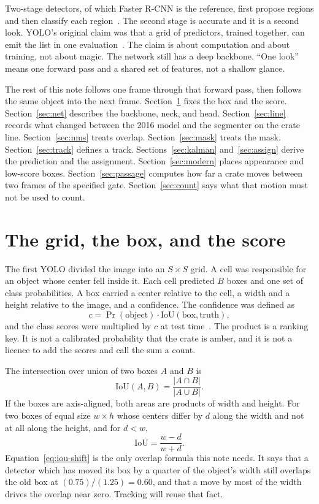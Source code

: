 \documentclass[11pt,a4paper]{article}
\begin{document}
Two-stage detectors, of which Faster R-CNN is the reference, first propose regions and then classify each region~\cite{ren2015faster}. The second stage is accurate and it is a second look. YOLO's original claim was that a grid of predictors, trained together, can emit the list in one evaluation~\cite{redmon2016yolo}. The claim is about computation and about training, not about magic. The network still has a deep backbone. ``One look'' means one forward pass and a shared set of features, not a shallow glance.

The rest of this note follows one frame through that forward pass, then follows the same object into the next frame. Section~\ref{sec:grid} fixes the box and the score. Section~\ref{sec:net} describes the backbone, neck, and head. Section~\ref{sec:line} records what changed between the 2016 model and the segmenter on the crate line. Section~\ref{sec:nms} treats overlap. Section~\ref{sec:mask} treats the mask. Section~\ref{sec:track} defines a track. Sections~\ref{sec:kalman} and~\ref{sec:assign} derive the prediction and the assignment. Section~\ref{sec:modern} places appearance and low-score boxes. Section~\ref{sec:passage} computes how far a crate moves between two frames of the specified gate. Section~\ref{sec:count} says what that motion must not be used to count.

\section{The grid, the box, and the score}
\label{sec:grid}

The first YOLO divided the image into an $S\times S$ grid. A cell was responsible for an object whose center fell inside it. Each cell predicted $B$ boxes and one set of class probabilities. A box carried a center relative to the cell, a width and a height relative to the image, and a confidence. The confidence was defined as
\begin{equation}
c = \Pr(\mathrm{object})\cdot \mathrm{IoU}(\mathrm{box},\mathrm{truth}),
\label{eq:conf}
\end{equation}
and the class scores were multiplied by $c$ at test time~\cite{redmon2016yolo}. The product is a ranking key. It is not a calibrated probability that the crate is amber, and it is not a licence to add the scores and call the sum a count.

The intersection over union of two boxes $A$ and $B$ is
\begin{equation}
\mathrm{IoU}(A,B) = \frac{|A\cap B|}{|A\cup B|}.
\label{eq:iou}
\end{equation}
If the boxes are axis-aligned, both areas are products of width and height. For two boxes of equal size $w\times h$ whose centers differ by $d$ along the width and not at all along the height, and for $d<w$,
\begin{equation}
\mathrm{IoU} = \frac{w-d}{w+d}.
\label{eq:iou-shift}
\end{equation}
Equation~\eqref{eq:iou-shift} is the only overlap formula this note needs. It says that a detector which has moved its box by a quarter of the object's width still overlaps the old box at $(0.75)/(1.25)=0.60$, and that a move by most of the width drives the overlap near zero. Tracking will reuse that fact.
\end{document}
